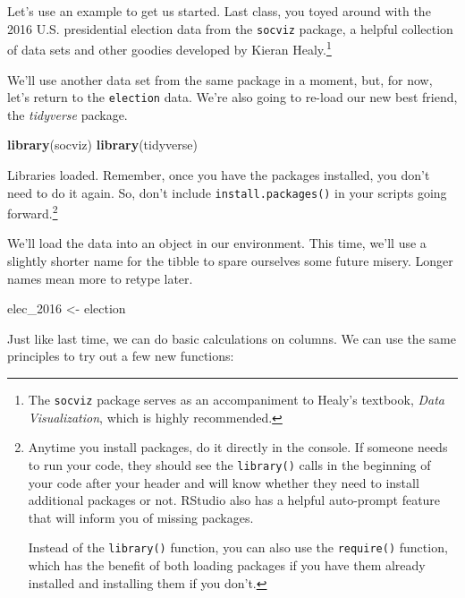 \documentclass[
]{book}
\newenvironment{Shaded}{\begin{snugshade}}{\end{snugshade}}
\newcommand{\CommentTok}[1]{\textcolor[rgb]{0.56,0.35,0.01}{\textit{#1}}}
\newcommand{\FunctionTok}[1]{\textcolor[rgb]{0.13,0.29,0.53}{\textbf{#1}}}
\newcommand{\NormalTok}[1]{#1}
\newcommand{\OtherTok}[1]{\textcolor[rgb]{0.56,0.35,0.01}{#1}}
\newcommand{\SpecialCharTok}[1]{\textcolor[rgb]{0.81,0.36,0.00}{\textbf{#1}}}
\begin{document}
Let's use an example to get us started. Last class, you toyed around with the 2016 U.S. presidential election data from the \texttt{socviz} package, a helpful collection of data sets and other goodies developed by Kieran Healy.\footnote{The \texttt{socviz} package serves as an accompaniment to Healy's textbook, \emph{Data Visualization}, which is highly recommended.}

We'll use another data set from the same package in a moment, but, for now, let's return to the \texttt{election} data. We're also going to re-load our new best friend, the \emph{tidyverse} package.

\begin{Shaded}
\begin{Highlighting}[]
\FunctionTok{library}\NormalTok{(socviz)}
\FunctionTok{library}\NormalTok{(tidyverse)}
\end{Highlighting}
\end{Shaded}

Libraries loaded. Remember, once you have the packages installed, you don't need to do it again. So, don't include \texttt{install.packages()} in your scripts going forward.\footnote{Anytime you install packages, do it directly in the console. If someone needs to run your code, they should see the \texttt{library()} calls in the beginning of your code after your header and will know whether they need to install additional packages or not. RStudio also has a helpful auto-prompt feature that will inform you of missing packages.

  Instead of the \texttt{library()} function, you can also use the \texttt{require()} function, which has the benefit of both loading packages if you have them already installed and installing them if you don't.}

We'll load the data into an object in our environment. This time, we'll use a slightly shorter name for the tibble to spare ourselves some future misery. Longer names mean more to retype later.

\begin{Shaded}
\begin{Highlighting}[]
\NormalTok{elec\_2016 }\OtherTok{\textless{}{-}}\NormalTok{ election}
\end{Highlighting}
\end{Shaded}

Just like last time, we can do basic calculations on columns. We can use the same principles to try out a few new functions:

\begin{Shaded}
\end{Shaded}
\end{document}
